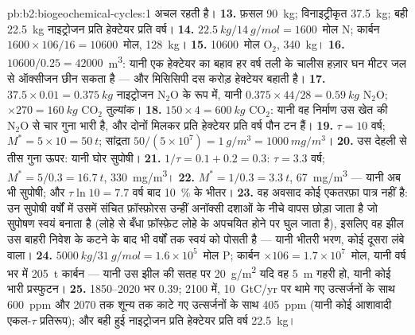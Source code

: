 \begin{solution}{pb:b2:biogeochemical-cycles:1}
अचल रहती है।
\textbf{13.} फ़सल \qty{90}{kg}; विनाइट्रीकृत \qty{37.5}{kg}; बही
\qty{22.5}{kg} नाइट्रोजन प्रति हेक्टेयर प्रति वर्ष।
\textbf{14.} $\qty{22.5}{kg}/\qty{14}{g/mol} = 1600$~मोल N; कार्बन
$1600\times 106/16 = \num{10600}$~मोल, \qty{128}{kg}।
\textbf{15.} \num{10600}~मोल $\mathrm{O_2}$, \qty{340}{kg}।
\textbf{16.} $\num{10600}/0.25 = \num{42000}$~\unit{m^3}: यानी एक
हेक्टेयर का बहाव हर वर्ष तली के चालीस हज़ार घन
मीटर जल से ऑक्सीजन छीन सकता है --- और मिसिसिपी
दस करोड़ हेक्टेयर बहाती है।
\textbf{17.} $37.5\times 0.01 = \qty{0.375}{kg}$ नाइट्रोजन
$\mathrm{N_2O}$ के रूप में, यानी $0.375\times 44/28 = \qty{0.59}{kg}$ $\mathrm{N_2O}$;
$\times 270 = \qty{160}{kg}$ $\mathrm{CO_2}$ तुल्यांक।
\textbf{18.} $150\times 4 = \qty{600}{kg}$ $\mathrm{CO_2}$: यानी वह
निर्माण उस खेत की $\mathrm{N_2O}$ से चार गुना भारी है, और
दोनों मिलकर प्रति हेक्टेयर प्रति वर्ष पौन टन हैं।
\textbf{19.} $\tau = 10$ वर्ष; $M^{*} = 5\times 10 = \qty{50}{t}$;
सांद्रता $50/(5\times 10^{7}) = \qty{1}{g/m^3} =
\qty{1000}{mg/m^3}$।
\textbf{20.} उस देहली से तीस गुना ऊपर: यानी घोर सुपोषी।
\textbf{21.} $1/\tau = 0.1 + 0.2 = 0.3$: $\tau = 3.3$ वर्ष; $M^{*} =
5/0.3 = \qty{16.7}{t}$, \qty{330}{mg/m^3}।
\textbf{22.} $M^{*} = 1/0.3 = \qty{3.3}{t}$, \qty{67}{mg/m^3} --- यानी अब भी
सुपोषी; और $\tau\ln 10 = 7.7$ वर्ष बाद \qty{10}{\%} के भीतर।
\textbf{23.} वह अवसाद कोई एकतरफ़ा पात्र नहीं है: उन सुपोषी वर्षों में
उसमें संचित फ़ॉस्फ़ोरस उन्हीं अनॉक्सी दशाओं के नीचे वापस छोड़ा जाता है
जो सुपोषण स्वयं बनाता है (लोहे से बँधा
फ़ॉस्फ़ेट लोहे के अपचयित होने पर घुल जाता है), इसलिए वह झील उस बाहरी निवेश के
कटने के बाद भी वर्षों तक स्वयं को पोसती है --- यानी भीतरी
भरण, कोई दूसरा  लंबे  वाला।
\textbf{24.} $\qty{5000}{kg}/\qty{31}{g/mol} = 1.6\times 10^{5}$~मोल P;
कार्बन $\times 106 = 1.7\times 10^{7}$~मोल, यानी वर्ष भर में \qty{205}{t}
कार्बन --- यानी उस झील की सतह पर \qty{20}{g/m^2} यदि वह
\qty{5}{m} गहरी हो, यानी कोई भारी प्रस्फुटन।
\textbf{25.} 1850--2020 भर  $0.39$; 2100 में,
\qty{10}{GtC/yr} पर थामे गए उत्सर्जनों के साथ \qty{600}{ppm} और
2070 तक शून्य तक काटे गए उत्सर्जनों के साथ \qty{405}{ppm} (यानी कोई आशावादी
एकल-$\tau$ प्रतिरूप); और बही हुई नाइट्रोजन प्रति हेक्टेयर प्रति वर्ष
\qty{22.5}{kg}।
\end{solution}
